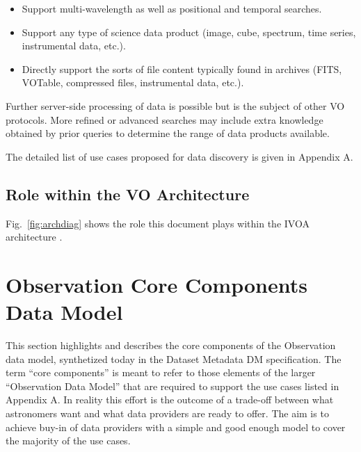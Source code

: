 \documentclass[11pt,a4paper]{ivoa}
\begin{document}
\begin{itemize}
\item Support multi-wavelength as well as positional and temporal searches.
\item Support any type of science data product (image, cube, spectrum, time series, instrumental data, etc.).
\item Directly support the sorts of file content typically found in archives (FITS, VOTable, compressed files,
instrumental data, etc.).
\end{itemize}
Further server-side processing of data is possible but is the subject of other VO protocols.  More refined or advanced
searches may include extra knowledge obtained by prior queries to determine the range of data products available.

The detailed list of use cases proposed for data discovery is given in Appendix A.

\subsection{Role within the VO Architecture}

\begin{figure}
\centering


\end{figure}

Fig.~\ref{fig:archdiag} shows the role this document plays within the
IVOA architecture \citep{2021ivoa.spec.1101D}.

\section[Observation Core Components Data Model]{Observation Core Components Data Model}
\label{bkm:Ref159237280}This section highlights and describes the core components of the Observation data model,
synthetized today in the Dataset Metadata DM specification. The term ``core components'' is meant to refer to those
elements of the larger ``Observation Data Model'' that are required to support the use cases listed in Appendix A.  In
reality this effort is the outcome of a trade-off between what astronomers want and what data providers are ready to
offer.  The aim is to achieve buy-in of data providers with a simple and {\textquotedbl}good enough{\textquotedbl}
model to cover the majority of the use cases.
\end{document}
